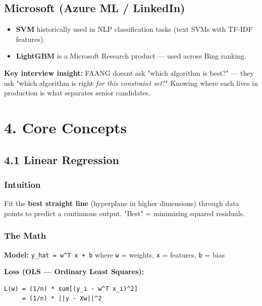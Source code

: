 \documentclass[11pt]{article}
\providecommand{\tightlist}{\setlength{\itemsep}{1pt}\setlength{\parskip}{0pt}}
\begin{document}
\subsection{Microsoft (Azure ML / LinkedIn)}\label{microsoft-azure-ml--linkedin}

\begin{itemize}
\tightlist
\item
  \textbf{SVM} historically used in NLP classification tasks (text SVMs with TF-IDF features).
\item
  \textbf{LightGBM} is a Microsoft Research product --- used across Bing ranking.
\end{itemize}

\textbf{Key interview insight:} FAANG doesn\textquotesingle t ask "which algorithm is best?" --- they ask "which algorithm is right \emph{for this constraint set}?" Knowing where each lives in production is what separates senior candidates.

\section{4. Core Concepts}\label{4-core-concepts}

\subsection{4.1 Linear Regression}\label{41-linear-regression}

\subsubsection{Intuition}\label{intuition}

Fit the \textbf{best straight line} (hyperplane in higher dimensions) through data points to predict a continuous output. "Best" = minimizing squared residuals.

\subsubsection{The Math}\label{the-math}

\textbf{Model:} \texttt{y\_hat\ =\ w\^{}T\ x\ +\ b} where \texttt{w} = weights, \texttt{x} = features, \texttt{b} = bias

\textbf{Loss (OLS --- Ordinary Least Squares):}

\setcodelang{}

\begin{verbatim}
L(w) = (1/n) * sum[(y_i - w^T x_i)^2]
     = (1/n) * ||y - Xw||^2
\end{verbatim}
\end{document}
